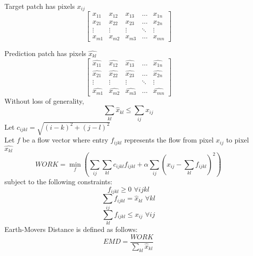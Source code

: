 \documentclass[twoside,11pt]{article}
\theoremstyle{definition}
\begin{document}
Target patch has pixels $x_{ij}$\\
\[
\begin{bmatrix}
    x_{11} & x_{12} & x_{13} & \dots  & x_{1n} \\
    x_{21} & x_{22} & x_{23} & \dots  & x_{2n} \\
    \vdots & \vdots & \vdots & \ddots & \vdots \\
    x_{m1} & x_{m2} & x_{m3} & \dots  & x_{mn}
\end{bmatrix}
\]

Prediction patch has pixels $\hat{x_{kl}}$\\
\[
\begin{bmatrix}
    \hat{x_{11}} & \hat{x_{12}} & \hat{x_{13}} & \dots  & \hat{x_{1n}} \\
    \hat{x_{21}} & \hat{x_{22}} & \hat{x_{23}} & \dots  & \hat{x_{2n}} \\
    \vdots & \vdots & \vdots & \ddots & \vdots \\
    \hat{x_{m1}} & \hat{x_{m2}} & \hat{x_{m3}} & \dots  & \hat{x_{mn}}
\end{bmatrix}
\]
Without loss of generality, 
\[
\sum_{kl}{\hat{x}_{kl}} \leq \sum_{ij}{x_{ij}}
\]
Let $c_{ijkl} = \sqrt{(i-k)^2 + (j-l)^2}$ \\
Let $f$ be a flow vector where entry $f_{ijkl}$ represents the flow from pixel $x_{ij}$ to pixel $\hat{x_{kl}}$\\
\[
WORK = \min_f(\sum_{ij}{\sum_{kl}{c_{ijkl} f_{ijkl}}} + \alpha \sum_{ij}{(x_{ij} - \sum_{kl}{f_{ijkl}})^2})
\]
subject to the following constraints:\\
\[
f_{ijkl} \geq 0 \, \, \forall ijkl
\]
\[
\sum_{ij}{f_{ijkl}} = \hat{x}_{kl} \, \, \forall kl
\]
\[
\sum_{kl}{f_{ijkl}} \leq x_{ij} \, \, \forall ij
\]
Earth-Movers Distance is defined as follows:
\[
EMD = \frac{WORK}{\sum_{kl}{\hat{x}_{kl}}}
\]
\end{document}

